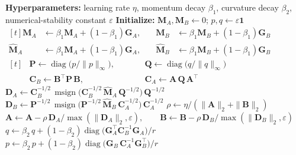 \documentclass{article}
\newcommand{\mat}[1]{\bm{#1}}
\DeclareMathOperator{\diag}{diag}
\DeclareMathOperator{\msign}{msign}          %
\newcommand{\norm}[1]{\| #1\|}
\newcommand{\methodname}{PoLoRA\xspace}
\begin{document}
\begin{algorithm}[t]
\caption{\methodname{} step for one LoRA pair $(\mat{A},\mat{B})$}
\label{alg:ours}
\begin{algorithmic}[1]
\Statex \textbf{Hyperparameters:} learning rate $\eta$, momentum decay $\beta_1$, curvature decay $\beta_2$, numerical-stability constant $\varepsilon$
\Statex \textbf{Initialize:} $\mat{M}_A, \mat{M}_B \gets 0$; \quad $p, q \gets \varepsilon\mathbf{1}$
\Statex
{}
\State $\begin{aligned}[t]
  \mat{M}_A &\gets \beta_1 \mat{M}_A+(1-\beta_1)\mat{G}_A, &\quad \mat{M}_B &\gets \beta_1 \mat{M}_B+(1-\beta_1)\mat{G}_B\\[-4pt]
  \widehat{\mat{M}}_A &\gets \beta_1 \mat{M}_A+(1-\beta_1)\mat{G}_A, &\quad \widehat{\mat{M}}_B &\gets \beta_1 \mat{M}_B+(1-\beta_1)\mat{G}_B
\end{aligned}$  \label{ln:mom}
\Statex
{}
\State $\begin{aligned}[t]
  &\mat{P} \gets \diag\!\big(p/\norm{p}_\infty\big), &&\qquad \mat{Q} \gets \diag\!\big(q/\norm{q}_\infty\big)\\[-4pt]
  &\mat{C}_B \gets \mat{B}^\top \mat{P}\, \mat{B}, &&\qquad \mat{C}_A \gets \mat{A}\,\mat{Q}\, \mat{A}^\top
\end{aligned}$  \label{ln:pqnorm}
\State $\mat{D}_A\gets \mat{C}_B^{-1/2}\,\msign\big(\mat{C}_B^{-1/2}\,\widehat{\mat{M}}_A\,\mat{Q}^{-1/2}\big)\,\mat{Q}^{-1/2}$  \label{ln:Aspectral}
\State $\mat{D}_B\gets \mat{P}^{-1/2}\,\msign\big(\mat{P}^{-1/2}\,\widehat{\mat{M}}_B\,\mat{C}_A^{-1/2}\big)\,\mat{C}_A^{-1/2}$  \label{ln:Bspectral}
\Statex
{}
\State $\rho\gets\eta/(\norm{\mat{A}}_2+\norm{\mat{B}}_2)$  \label{ln:rho}
\State $\mat{A}\gets \mat{A}-\rho\,\mat{D}_A/\max(\norm{\mat{D}_A}_2,\varepsilon), \qquad \mat{B}\gets \mat{B}-\rho\,\mat{D}_B/\max(\norm{\mat{D}_B}_2,\varepsilon)$ \label{ln:spectralnormupdate}
\Statex
{}
\State $q\gets\beta_2\, q+(1-\beta_2)\diag\big(\mat{G}_A^\top \mat{C}_B^{-1} \mat{G}_A\big)/r$   \label{ln:qmom}
\State $p\gets\beta_2\, p+(1-\beta_2)\diag\big(\mat{G}_B\, \mat{C}_A^{-1} \mat{G}_B^\top\big)/r$  \label{ln:pmom}
\end{algorithmic}
\end{algorithm}
% 
\end{document}
